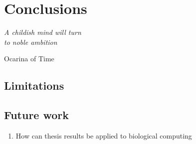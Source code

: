 \chapter{Conclusions}
\label{chapter:conclusions}
\epigraph{\textit{A childish mind will turn\\to noble ambition}}{Ocarina of Time}

\section{Limitations}

\section{Future work}
\begin{enumerate}
    \item How can thesis results be applied to biological computing \cite{Dalchau2018}
\end{enumerate}